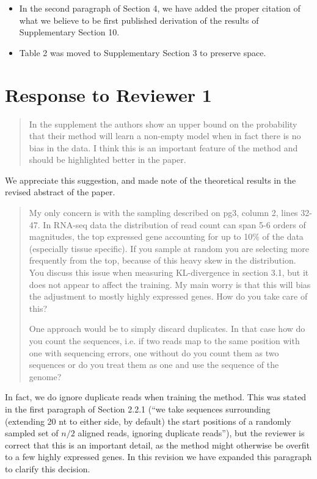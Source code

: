\documentclass{article}
\begin{document}
\begin{itemize}
\item In the second paragraph of Section 4, we have added the proper citation of
what we believe to be first published derivation of the results of Supplementary
Section 10.


\item Table 2 was moved to Supplementary Section 3 to preserve space.

\end{itemize}

\section*{Response to Reviewer 1}

\begin{quote}
In the supplement the authors show an upper bound on the probability that their
method will learn a non-empty model when in fact there is no bias in the data. I
think this is an important feature of the method and should be highlighted
better in the paper.
\end{quote}

We appreciate this suggestion, and made note of the theoretical results in the
revised abstract of the paper.


\begin{quote}
My only concern is with the sampling described on pg3, column 2, lines 32-47.
In RNA-seq data the distribution of read count can span 5-6 orders of
magnitudes, the top expressed gene accounting for up to 10\% of the data
(especially tissue specific). If you sample at random you are selecting more
frequently from the top, because of this heavy skew in the distribution. You
discuss this issue when measuring KL-divergence in section 3.1, but it does not
appear to affect the training. My main worry is that this will bias the
adjustment to mostly highly expressed genes. How do you take care of this?

One approach would be to simply discard duplicates. In that case how do you
count the sequences, i.e. if two reads map to the same position with one with
sequencing errors, one without do you count them as two sequences or do you
treat them as one and use the sequence of the genome?
\end{quote}

In fact, we do ignore duplicate reads when training the method. This was stated
in the first paragraph of Section 2.2.1 (``we take sequences surrounding
(extending 20 nt to either side, by default) the start positions of a randomly
sampled set of $n/2$ aligned reads, ignoring duplicate reads''), but the reviewer is
correct that this is an important detail, as the method might otherwise be
overfit to a few highly expressed genes. In this revision we have expanded
this paragraph to clarify this decision.
\end{document}
